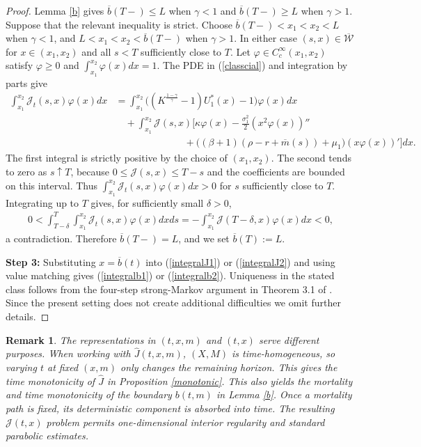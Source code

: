 \documentclass[a4paper,11pt]{amsart}
\numberwithin{equation}{section}
\newtheorem{remark}{Remark}[section]
\begin{document}
{{{\begin{proof}
Lemma \ref{b} gives $\overline b(T-)\leq L$ when $\gamma<1$ and $\overline b(T-)\geq L$ when $\gamma>1$. Suppose that the relevant inequality is strict. Choose $\overline b(T-)<x_1<x_2<L$ when $\gamma<1$, and $L<x_1<x_2<\overline b(T-)$ when $\gamma>1$. In either case $(s,x)\in\overline{\mathcal W}$ for $x\in(x_1,x_2)$ and all $s<T$ sufficiently close to $T$. Let $\varphi\in C_c^\infty(x_1,x_2)$ satisfy $\varphi\geq0$ and $\int_{x_1}^{x_2}\varphi(x)dx=1$. The PDE in (\ref{classcial}) and integration by parts give
\begin{align*}
\int_{x_1}^{x_2}\mathcal J_t(s,x)\varphi(x)dx
&=\int_{x_1}^{x_2}\Big((K^{\frac{1-\gamma}{\gamma}}-1)U_1^\ast(x)-1\Big)\varphi(x)dx\\
&\quad+\int_{x_1}^{x_2}\mathcal J(s,x)\bigg[\kappa\varphi(x)-\frac{\sigma_1^2}{2}(x^2\varphi(x))''\\
&\hspace{85pt}+\Big((\beta+1)(\rho-r+\overline m(s))+\mu_1\Big)(x\varphi(x))'\bigg]dx.
\end{align*}
The first integral is strictly positive by the choice of $(x_1,x_2)$. The second tends to zero as $s\uparrow T$, because $0\leq\mathcal J(s,x)\leq T-s$ and the coefficients are bounded on this interval. Thus $\int_{x_1}^{x_2}\mathcal J_t(s,x)\varphi(x)dx>0$ for $s$ sufficiently close to $T$. Integrating up to $T$ gives, for sufficiently small $\delta>0$,
\begin{align*}
0<\int_{T-\delta}^T\int_{x_1}^{x_2}\mathcal J_t(s,x)\varphi(x)dxds
=-\int_{x_1}^{x_2}\mathcal J(T-\delta,x)\varphi(x)dx<0,
\end{align*}
a contradiction.  Therefore $\overline b(T-)=L$, and we set $\overline b(T):=L$.

\textbf{Step 3:} Substituting $x=\overline b(t)$ into (\ref{integralJ1}) or (\ref{integralJ2}) and using value matching gives (\ref{integralb1}) or (\ref{integralb2}). Uniqueness in the stated class follows from the four-step strong-Markov argument in Theorem 3.1 of \citet{peskir2005american}. Since the present setting does not create additional difficulties we omit further details.
\end{proof}

\begin{remark}
The representations in $(t,x,m)$ and $(t,x)$ serve different purposes. When working with $\widehat{J}(t,x,m)$, $(X,M)$ is time-homogeneous, so varying $t$ at fixed $(x,m)$ only changes the remaining horizon. This gives the time monotonicity of $\widehat J$ in Proposition \ref{monotonic}. This also yields the mortality and time monotonicity of the boundary $b(t,m)$ in Lemma \ref{b}. Once a mortality path is fixed, its deterministic component is absorbed into time. The resulting $\mathcal J(t,x)$ problem permits one-dimensional interior regularity and standard parabolic estimates.


\end{remark}}}}
\end{document}
